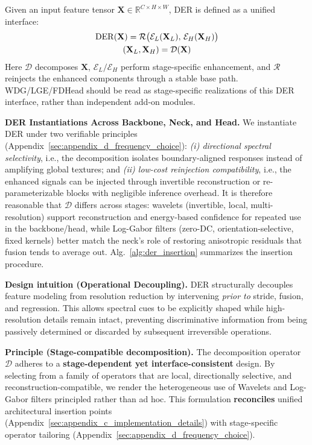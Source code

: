 \documentclass{article}
\theoremstyle{plain}
\theoremstyle{definition}
\theoremstyle{remark}
\begin{document}
Given an input feature tensor $\mathbf{X} \in \mathbb{R}^{C \times H \times W}$, DER is defined as a unified interface:
\vspace{-0.2cm}
\begin{equation}
\label{eq:der_operator}
\begin{gathered}
\mathrm{DER}(\mathbf{X}) = \mathcal{R}\bigl(\mathcal{E}_{L}(\mathbf{X}_{L}),\,\mathcal{E}_{H}(\mathbf{X}_{H})\bigr)\\
(\mathbf{X}_{L},\mathbf{X}_{H}) = \mathcal{D}(\mathbf{X})
\end{gathered}
\vspace{-0.2cm}
\end{equation}
Here $\mathcal{D}$ decomposes $\mathbf{X}$, $\mathcal{E}_L/\mathcal{E}_H$ perform stage-specific enhancement, and $\mathcal{R}$ reinjects the enhanced components through a stable base path.
WDG/LGE/FDHead should be read as stage-specific realizations of this DER interface, rather than independent add-on modules.


\noindent\textbf{DER Instantiations Across Backbone, Neck, and Head.}  
We instantiate DER under two verifiable principles (Appendix~\ref{sec:appendix_d_frequency_choice}): \emph{(i) directional spectral selectivity}, i.e., the decomposition isolates boundary-aligned responses instead of amplifying global textures; and \emph{(ii) low-cost reinjection compatibility}, i.e., the enhanced signals can be injected through invertible reconstruction or re-parameterizable blocks with negligible inference overhead. It is therefore reasonable that $\mathcal{D}$ differs across stages: wavelets (invertible, local, multi-resolution) support reconstruction and energy-based confidence for repeated use in the backbone/head, while Log-Gabor filters (zero-DC, orientation-selective, fixed kernels) better match the neck’s role of restoring anisotropic residuals that fusion tends to average out. Alg.~\ref{alg:der_insertion} summarizes the insertion procedure.

\noindent\textbf{Design intuition (Operational Decoupling).}  
DER structurally decouples feature modeling from resolution reduction by intervening \emph{prior to} stride, fusion, and regression. This allows spectral cues to be explicitly shaped while high-resolution details remain intact, preventing discriminative information from being passively determined or discarded by subsequent irreversible operations.

\noindent\textbf{Principle (Stage-compatible decomposition).}  
The decomposition operator $\mathcal{D}$ adheres to a \textbf{stage-dependent yet interface-consistent} design. By selecting from a family of operators that are local, directionally selective, and reconstruction-compatible, we render the heterogeneous use of Wavelets and Log-Gabor filters principled rather than ad hoc. This formulation \textbf{reconciles} unified architectural insertion points (Appendix~\ref{sec:appendix_c_implementation_details}) with stage-specific operator tailoring (Appendix~\ref{sec:appendix_d_frequency_choice}).
\end{document}
